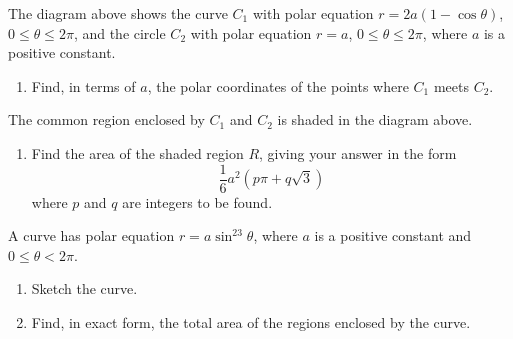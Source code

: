 \documentclass[leqno]{article}
\begin{document}
\begin{enumerate}[
  label=\textbf{\arabic*.},
  leftmargin=*,
  topsep=0pt,
  partopsep=0pt,
  parsep=0pt
]
The diagram above shows the curve $C_1$ with polar equation $r=2a(1-\cos\theta)$, $0\leq\theta\leq2\pi$, and the circle $C_2$ with polar equation $r=a$, $0\leq\theta\leq2\pi$, where $a$ is a positive constant. \\
\begin{enumerate}[label=\textbf{(\alph*)}]
  \item Find, in terms of $a$, the polar coordinates of the points where $C_1$ meets $C_2$.  \\
\end{enumerate}
The common region enclosed by $C_1$ and $C_2$ is shaded in the diagram above. \\
\begin{enumerate}[label=\textbf{(\alph*)}, resume]
  \item Find the area of the shaded region $R$, giving your answer in the form
  \[
  \frac{1}{6}a^2\left(p\pi+q\sqrt{3}\right)
  \]
  where $p$ and $q$ are integers to be found.  \\
\end{enumerate}

\newpage

\questionitem

A curve has polar equation $r=a\sin^23\theta$, where $a$ is a positive constant and $0\leq \theta<2\pi$. \\
\begin{enumerate}[label=\textbf{(\alph*)}]
  \item Sketch the curve.  \\
  \item Find, in exact form, the total area of the regions enclosed by the curve.  \\
\end{enumerate}

\newpage

\questionitem

\begin{figure}[H]
    \centering
{}
\end{figure}
\end{enumerate}
\end{document}
